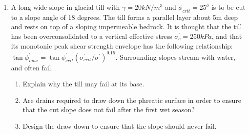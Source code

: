 \documentclass[a4paper,12pt]{article}
\begin{document}
\begin{enumerate}
	\item A long wide slope in glacial till with $\gamma = 20 kN/m^3$ and $\phi_{crit} = 25^o$ is to be cut to a slope angle of 18 degrees. The till forms a parallel layer about 5m deep and rests on top of a sloping impermeable bedrock. It is thought that the till has been overconsolidated to a vertical effective stress $\sigma_c^\prime = 250 kPa$, and that its monotonic peak shear strength
	envelope has the following relationship: $\tan \phi^\prime_{max} = \tan \phi^\prime_{crit} (\sigma_{crit}^\prime / \sigma^\prime)^{0.15}$. Surrounding slopes stream with water, and often fail.
	\begin{enumerate}
		\item Explain why the till may fail at its base.
		\item Are drains required to draw down the phreatic surface in order to ensure that the cut slope does not fail after the first wet season?
		\item Design the draw-down to ensure that the slope should never fail.
	\end{enumerate}
\end{enumerate}
\end{document}
